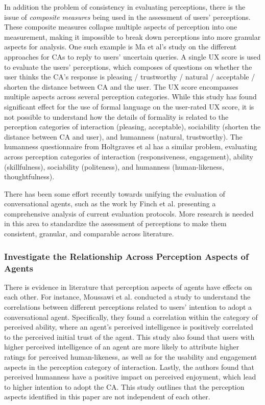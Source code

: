 In addition the problem of consistency in evaluating perceptions, there is the issue of  \textit{composite measures} being used in the assessment of users' perceptions. These composite measures collapse multiple aspects of perception into one measurement, making it impossible to break down perceptions into more granular aspects for analysis. One such example is Ma et al's study \cite{ma2022ask}\cmt{[29]} on the different approaches for CAs to reply to users' uncertain queries. A single UX score is used to evaluate the users' perceptions, which composes of questions on whether the user thinks the CA's response is pleasing / trustworthy / natural / acceptable / shorten the distance between CA and the user. The UX score encompasses multiple aspects across several perception categories. While this study has found significant effect for the use of formal language on the user-rated UX score, it is not possible to understand how the details of formality is related to the perception categories of interaction (pleasing, acceptable), sociability (shorten the distance between CA and user), and humanness (natural, trustworthy). The humanness questionnaire from Holtgraves et al \cite{holtgraves2007perceiving} has a similar problem, evaluating across perception categories of interaction (responsiveness, engagement), ability (skillfulness), sociability (politeness), and humanness (human-likeness, thoughtfulness).

There has been some effort recently towards unifying the evaluation of conversational agents, such as the work by Finch et al. \cite{finch2020towards} presenting a comprehensive analysis of current evaluation protocols. More research is needed in this area to standardize the assessment of perceptions to make them consistent, granular, and comparable across literature.

\subsubsection{Investigate the Relationship Across Perception Aspects of Agents}

There is evidence in literature that perception aspects of agents have effects on each other. For instance, Moussawi et al. \cite{moussawi2021perceptions}\cmt{[36]} conducted a study to understand the correlations between different perceptions related to users' intention to adopt a conversational agent. Specifically, they found a correlation within the category of perceived ability, where an agent's perceived intelligence is positively correlated to the perceived initial trust of the agent. This study also found that users with higher perceived intelligence of an agent are more likely to attribute higher ratings for perceived human-likeness, as well as for the usability and engagement aspects in the perception category of interaction. Lastly, the authors found that perceived humanness have a positive impact on perceived enjoyment, which lead to higher intention to adopt the CA. This study outlines that the perception aspects identified in this paper are not independent of each other.

